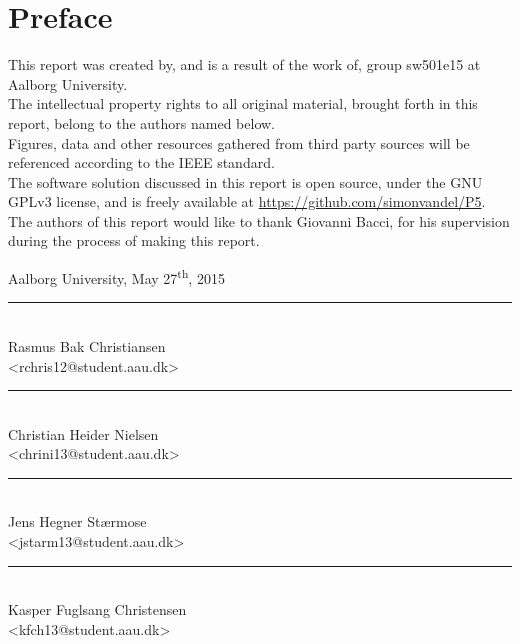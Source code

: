 \chapter{Preface}\label{ch:preface}
This report was created by, and is a result of the work of, group sw501e15 at Aalborg University. \\
The intellectual property rights to all original material, brought forth in this report, belong to the authors named below.\\
Figures, data and other resources gathered from third party sources will be referenced according to the IEEE standard. \\
The software solution discussed in this report is open source, under the GNU GPLv3 license, and is freely available at \url{https://github.com/simonvandel/P5}.\\

The authors of this report would like to thank Giovanni Bacci, for his supervision during the process of making this report.

\vspace{\baselineskip}\hfill Aalborg University, May 27\textsuperscript{th}, 2015
\vfill

\noindent
\begin{minipage}[b]{0.45\textwidth}
 \centering
 \rule{\textwidth}{0.5pt}\\
  Rasmus Bak Christiansen\\
 {\footnotesize <rchris12@student.aau.dk>}
\end{minipage}
%
\hfill
%
\begin{minipage}[b]{0.45\textwidth}
 \centering
 \rule{\textwidth}{0.5pt}\\
  Christian Heider Nielsen\\
 {\footnotesize <chrini13@student.aau.dk>}
\end{minipage}
%
\vspace{3\baselineskip}

\noindent
\begin{minipage}[b]{0.45\textwidth}
 \centering
 \rule{\textwidth}{0.5pt}\\
 Jens Hegner Stærmose\\
 {\footnotesize <jstarm13@student.aau.dk>}
\end{minipage}
%
\hfill
%
\begin{minipage}[b]{0.45\textwidth}
 \centering
 \rule{\textwidth}{0.5pt}\\
  Kasper Fuglsang Christensen\\
 {\footnotesize <kfch13@student.aau.dk>}
\end{minipage}
\vspace{3\baselineskip}

